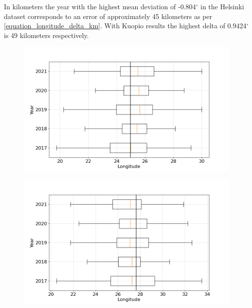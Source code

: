 In kilometers the year with the highest mean deviation of -0.804$^\circ$ in the Helsinki dataset corresponds to an error of approximately 45 kilometers as per \ref{equation_longitude_delta_km}. With Kuopio results the highest delta of 0.9424$^\circ$ is 49 kilometers respectively.

\begin{figure}[ht!]
\centering
\includegraphics[width=0.9\linewidth]{pics/longitude_v2_helsinki}
\label{fig_longitude_estimation_helsinki}
\end{figure}


\begin{figure}[ht!]
\centering
\includegraphics[width=0.9\linewidth]{pics/longitude_v2_kuopio}
\label{fig_longitude_estimation_kuopio}
\end{figure}


